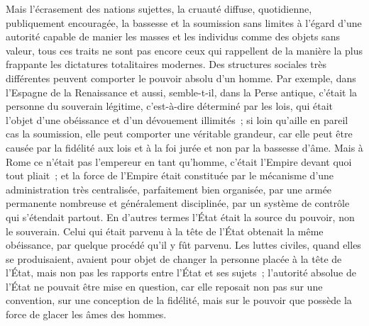 \documentclass[french,twoside]{book} %
\begin{document}
Mais l'écrasement des nations sujettes, la cruauté diffuse, quotidienne, publiquement encouragée, la bassesse et la soumission sans limites à l'égard d'une autorité capable de manier les masses et les individus comme des objets sans valeur, tous ces traits ne sont pas encore ceux qui rappellent de la manière la plus frappante les dictatures totalitaires modernes. Des structures sociales très différentes peuvent comporter le pouvoir absolu d'un homme. Par exemple, dans l'Espagne de la Renaissance et aussi, semble-t-il, dans la Perse antique, c'était la personne du souverain légitime, c'est-à-dire déterminé par les lois, qui était l'objet d'une obéissance et d'un dévouement illimités ; si loin qu'aille en pareil cas la soumission, elle peut comporter une véritable gran­deur, car elle peut être causée par la fidélité aux lois et à la foi jurée et non par la bassesse d'âme. Mais à Rome ce n'était pas l'empereur en tant qu'homme, c'était l'Empire devant quoi tout pliait ; et la force de l'Empire était constituée par le mécanisme d'une administration très centralisée, parfaitement bien organisée, par une armée permanente nombreuse et généralement disciplinée, par un système de contrôle qui s'étendait partout. En d'autres termes l'État était la source du pouvoir, non le souverain. Celui qui était parvenu à la tête de l'État obtenait la même obéissance, par quelque procédé qu'il y fût parvenu. Les luttes civiles, quand elles se produisaient, avaient pour objet de changer la personne placée à la tête de l'État, mais non pas les rapports entre l'État et ses sujets ; l'autorité absolue de l'État ne pouvait être mise en question, car elle reposait non pas sur une convention, sur une conception de la fidélité, mais sur le pouvoir que possède la force de glacer les âmes des hommes.\par
\end{document}
